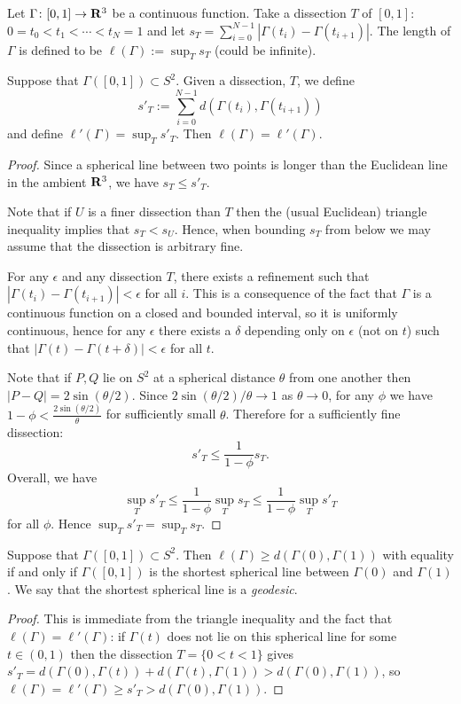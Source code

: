 \documentclass[12pt]{article}
\begin{document}
\begin{dfn}
  Let $\Gamma\colon[0,1]\to\mathbf{R}^3$ be a continuous function. Take a dissection $T$ of $[0,1]$: $0=t_0<t_1<\cdots<t_N=1$ and let $s_T=\sum_{i=0}^{N-1}|\Gamma(t_i)-\Gamma(t_{i+1})|$. The length of $\Gamma$ is defined to be $\ell(\Gamma):=\sup_Ts_T$ (could be infinite).
\end{dfn}

\begin{lma}
  Suppose that $\Gamma([0,1])\subset S^2$. Given a dissection, $T$, we define
  \[s'_T:=\sum_{i=0}^{N-1}d(\Gamma(t_i),\Gamma(t_{i+1}))\]
  and define $\ell'(\Gamma)=\sup_Ts'_T$. Then $\ell(\Gamma)=\ell'(\Gamma)$.
\end{lma}
\begin{proof}
  Since a spherical line between two points is longer than the Euclidean line in the ambient $\mathbf{R}^3$, we have $s_T\leq s'_T$.
  
  Note that if $U$ is a finer dissection than $T$ then the (usual Euclidean) triangle inequality implies that $s_T<s_U$. Hence, when bounding $s_T$ from below we may assume that the dissection is arbitrary fine.

  For any $\epsilon$ and any dissection $T$, there exists a refinement such that $|\Gamma(t_i)-\Gamma(t_{i+1})|<\epsilon$ for all $i$. This is a consequence of the fact that $\Gamma$ is a continuous function on a closed and bounded interval, so it is uniformly continuous, hence for any $\epsilon$ there exists a $\delta$ depending only on $\epsilon$ (not on $t$) such that $|\Gamma(t)-\Gamma(t+\delta)|<\epsilon$ for all $t$.

  Note that if $P,Q$ lie on $S^2$ at a spherical distance $\theta$ from one another then $|P-Q|=2\sin(\theta/2)$. Since $2\sin(\theta/2)/\theta\to 1$ as $\theta\to 0$, for any $\phi$ we have $1-\phi<\frac{2\sin(\theta/2)}{\theta}$ for sufficiently small $\theta$. Therefore for a sufficiently fine dissection:
  \[s'_T\leq\frac{1}{1-\phi}s_T.\]
  Overall, we have
  \[\sup_Ts'_T\leq\frac{1}{1-\phi}\sup_Ts_T\leq\frac{1}{1-\phi}\sup_Ts'_T\]
  for all $\phi$. Hence $\sup_Ts'_T=\sup_Ts_T$.
\end{proof}

\begin{thm}
  Suppose that $\Gamma([0,1])\subset S^2$. Then $\ell(\Gamma)\geq d(\Gamma(0),\Gamma(1))$ with equality if and only if $\Gamma([0,1])$ is the shortest spherical line between $\Gamma(0)$ and $\Gamma(1)$. We say that the shortest spherical line is a {\em geodesic}.
\end{thm}
\begin{proof}
  This is immediate from the triangle inequality and the fact that $\ell(\Gamma)=\ell'(\Gamma)$: if $\Gamma(t)$ does not lie on this spherical line for some $t\in(0,1)$ then the dissection $T=\{0<t<1\}$ gives $s'_T=d(\Gamma(0),\Gamma(t))+d(\Gamma(t),\Gamma(1))>d(\Gamma(0),\Gamma(1))$, so $\ell(\Gamma)=\ell'(\Gamma)\geq s'_T>d(\Gamma(0),\Gamma(1))$.
\end{proof}
\end{document}
